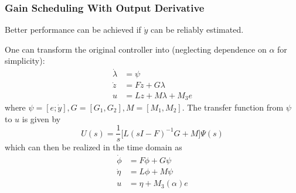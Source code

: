 \subsubsection{Gain Scheduling With Output Derivative}
Better performance can be achieved if $\dot{y}$ can be reliably estimated.

\newpar{}

One can transform the original controller into (neglecting dependence on $\alpha$ for simplicity):
\begin{align*}
    \dot{\lambda} & = \psi                  \\
    \dot{z}       & = Fz + G\lambda         \\
    u             & = Lz + M\lambda + M_3 e
\end{align*}
where $\psi = [e; \dot{y}], G = [G_1, G_2], M = [M_1, M_2]$.
\newpar{}
The transfer function from $\psi$ to $u$ is given by
\begin{equation*}
    U(s) = \frac{1}{s} \big[ L{(sI - F)}^{-1}G + M \big] \Psi(s)
\end{equation*}
which can then be realized in the time domain as
\begin{align*}
    \dot{\phi} & = F\phi + G\psi       \\
    \dot{\eta} & = L\phi + M\psi       \\
    u          & = \eta + M_3(\alpha)e
\end{align*}

\newpar{}

